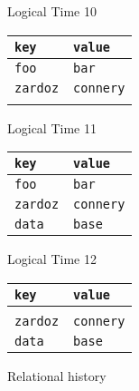 \begin{figure}[ht]
  \centering
  \small

  \begin{minipage}{0.3\columnwidth}
    Logical Time 10

    \begin{tabular}{|l|l|}
      \hline
      \rowcolor{flatgray!30}
      \textbf{\texttt{key}} & \textbf{\texttt{value}} \\\hline
      \texttt{foo}          & \texttt{bar} \\
      \texttt{zardoz}       & \texttt{connery} \\
                            & \\\hline
    \end{tabular}
  \end{minipage}\hspace{0.3cm}
  \begin{minipage}{0.3\columnwidth}
    Logical Time 11

    \begin{tabular}{|l|l|}
      \hline
      \rowcolor{flatgray!30}
      \textbf{\texttt{key}} & \textbf{\texttt{value}} \\\hline
      \texttt{foo}          & \texttt{bar} \\
      \texttt{zardoz}       & \texttt{connery} \\
      \rowcolor{flatgreen!20}
      \texttt{data}         & \texttt{base} \\\hline
    \end{tabular}
  \end{minipage}\hspace{0.3cm}
  \begin{minipage}{0.3\columnwidth}
    Logical Time 12

    \begin{tabular}{|l|l|}
      \hline
      \rowcolor{flatgray!30}
      \textbf{\texttt{key}} & \textbf{\texttt{value}} \\\hline
      \rowcolor{flatred!20}
                            &              \\
      \texttt{zardoz}       & \texttt{connery} \\
      \texttt{data}         & \texttt{base} \\\hline
    \end{tabular}
  \end{minipage}

  \caption{Relational history}
\end{figure}
